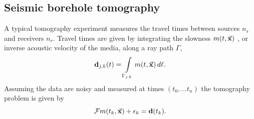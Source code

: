 \documentclass[12pt]{article}
\newcommand {\bfd}   { {\bf d} }
\newcommand {\vx}    {\vec {\bf x}}
\newcommand{\CF}  {\mathcal{F}}    %
\begin{document}
\subsection{Seismic borehole tomography}
 A typical tomography experiment measures the travel times between sources $n_s$ and receivers $n_r$. Travel times are given by integrating the slowness  $m(t,\vx)$ , or inverse acoustic velocity of the media,  along a ray path $\Gamma$,
\begin{equation*}\label{eq:tomo}
\bfd_{j,k}(t) =  \int\limits_{\Gamma_{j,k}} m(t,\vx)\, d\ell.
\end{equation*}
 Assuming the data are noisy and measured at times $(t_0,...t_n)$ the tomography problem is given by 
 \begin{equation*}
 \CF m(t_{k},\vx) + \epsilon_{k}  = \bfd(t_{k}).\\
\end{equation*}
\end{document}
